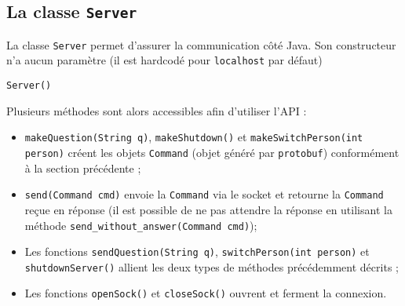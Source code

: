 \documentclass[10pt,a4paper]{article}
\begin{document}
\subsection{La classe \texttt{Server}}
La classe \texttt{Server} permet d'assurer la communication côté Java. Son constructeur n'a aucun paramètre (il est hardcodé pour \texttt{localhost} par défaut)
\begin{center}
\texttt{Server()}
\end{center}
Plusieurs méthodes sont alors accessibles afin d'utiliser l'API :
\begin{itemize}
\item \texttt{makeQuestion(String q)}, \texttt{makeShutdown()} et \texttt{makeSwitchPerson(int person)} créent les objets \texttt{Command} (objet généré par \texttt{protobuf}) conformément à la section précédente ;
\item \texttt{send(Command cmd)} envoie la \texttt{Command} via le socket et retourne la \texttt{Command} reçue en réponse (il est possible de ne pas attendre la réponse en utilisant la méthode \texttt{send\_without\_answer(Command cmd)});
\item Les fonctions \texttt{sendQuestion(String q)}, \texttt{switchPerson(int person)} et \texttt{shutdownServer()} allient les deux types de méthodes précédemment décrits ;
\item Les fonctions \texttt{openSock()} et \texttt{closeSock()} ouvrent et ferment la connexion. 
\end{itemize}
\end{document}
